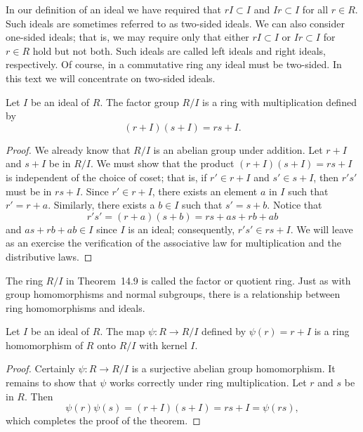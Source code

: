  
In our definition of an ideal we have required that $rI \subset I$ and
$Ir \subset I$ for all $r \in R$.  Such ideals are sometimes referred
to as {\bfi two-sided ideals}.  We can also
consider {\bfi one-sided ideals}; that is,  we
may require only that either $rI \subset I$ or $Ir \subset I$ for $r
\in R$ hold but not both. Such ideals are called {\bfi left ideals\/}
and {\bfi right ideals}, respectively. Of course, in a commutative
ring any ideal must be two-sided. In this text we will concentrate on
two-sided ideals.
 

 
 
\begin{theorem}
Let $I$ be an ideal of $R$. The factor group $R/I$ is a ring with
multiplication defined by
\[
(r + I)(s + I) = rs + I.
\]
\end{theorem}
 
 
\begin{proof}
We already know that $R/I$ is an abelian group under addition. Let
$r+I$ and $s +I$ be in $R/I$. We must show that the product $(r + I)(s
+ I) = rs + I$ is independent of the choice of coset; that is, if $r' \in
r+I$ and $s' \in s+I$, then $r's'$ must be in $rs+I$. Since $r' \in
r+I$, there exists an element $a$  in $I$ such that $r' = r + a$.
Similarly, there exists a $b \in I$ such that $s' = s + b$. Notice
that 
\[
r' s' = (r+a)(s+b) = rs + as + rb + ab
\]
and $as + rb + ab \in I$ since $I$ is an ideal; consequently, $r' s'
\in rs + I$. We will leave as an exercise the verification of the 
associative law for multiplication and the distributive laws.
\end{proof}
 
 
\vspace{2ex}
 
 
The ring $R/I$ in Theorem~14.9 is called the {\bfi
factor\/} or {\bfi quotient
ring}. Just as with group homomorphisms and
normal subgroups, there is a relationship between ring homomorphisms
and ideals.  
 
 
\begin{theorem}
Let $I$ be an ideal of $R$. The map $\psi : R \rightarrow R/I$ defined
by $\psi( r ) = r + I$ is a ring homomorphism of $R$ onto $R/I$ with
kernel $I$.
\end{theorem}
 
 
\begin{proof}
Certainly $\psi : R \rightarrow R/I$ is a surjective abelian group
homomorphism. It remains to show that $\psi$ works correctly under
ring multiplication.  Let $r$ and $s$ be in $R$. Then
\[
\psi(r) \psi(s) = (r + I)(s+I) = rs + I = \psi(rs),
\]
which completes the proof of the theorem.
\end{proof}
 
